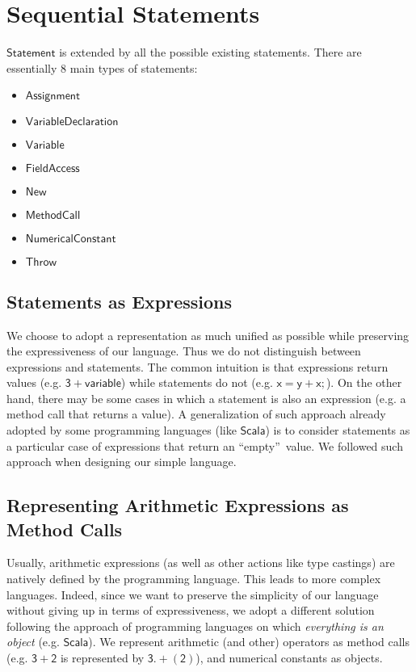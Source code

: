 \documentclass[11pt]{article}
\newcommand{\statement}[1]{\ensuremath{\mathsf{#1}}}
\newcommand{\Scala}{\ensuremath{\mathsf{Scala}}}
\begin{document}
\section{Sequential Statements}
\statement{Statement} is extended by all the possible existing statements. There are essentially 8 main types of statements:
\begin{itemize}
\item \statement{Assignment} 
\item \statement{VariableDeclaration} 
\item \statement{Variable} 
\item \statement{FieldAccess} 
\item \statement{New} 
\item \statement{MethodCall}
\item \statement{NumericalConstant} 
\item \statement{Throw} 
\end{itemize}

\subsection{Statements as Expressions}
We choose to adopt a representation as much unified as possible while preserving the expressiveness of our language. Thus we do not distinguish between expressions and statements. The common intuition is that expressions return values (e.g. \statement{3+variable}) while statements do not (e.g. \statement{x=y+x;}). On the other hand, there may be some cases in which a statement is also an expression (e.g. a method call that returns a value). A generalization of such approach already adopted by some programming languages  (like \Scala) is to consider statements as a particular case of expressions that return an \textquotedblleft empty\textquotedblright\ value. We followed such approach when designing our simple language.

\subsection{Representing Arithmetic Expressions as Method Calls}
Usually, arithmetic expressions (as well as other actions like type castings) are natively defined by the programming language. This leads to more complex languages. Indeed, since we want to preserve the simplicity of our language without giving up in terms of expressiveness, we adopt a different solution following the approach of programming languages on which \emph{everything is an object} (e.g. \Scala). We represent arithmetic (and other) operators as method calls (e.g. \statement{3+2} is represented by \statement{3.+(2)}), and numerical constants as objects.
\end{document}
